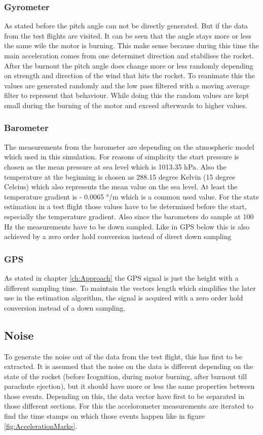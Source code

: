 \subsubsection{Gyrometer}
As stated before the pitch angle can not be directly generated.
But if the data from the test flights are visited. It can be seen that the angle stays more or less the same wile the motor is burning.
This make sense because during this time the main acceleration comes from one determinet direction and stabilises the rocket.
After the burnout the pitch angle does change more or less randomly depending on strength and direction of the wind that hits the rocket.
To reanimate this the values are generated randomly and the low pass filtered with a moving average filter to represent that behaviour.
While doing this the random values are kept small during the burning of the motor and exceed afterwards to higher values.

\subsubsection{Barometer}
The measurements from the barometer are depending on the atmospheric model which used in this simulation.
For reasons of simplicity the start pressure is chosen as the mean pressure at sea level which is 1013.35 hPa.
Also the temperature at the beginning is chosen as 288.15 degree Kelvin (15 degree Celcius) which also represents the mean value on the sea level.
At least the temperature gradient is - 0.0065 °/m which is a common used value.
For the state estimation in a test flight those values have to be determined before the start, especially the temperature gradient.
Also since the barometers do sample at 100 Hz the measurements have to be down sampled.
Like in GPS below this is also achieved by a zero order hold conversion instead of direct down sampling

\subsubsection{GPS}
As stated in chapter \ref{ch:Approach} the GPS signal is just the height with a different sampling time. 
To maintain the vectors length which simplifies the later use in the estimation algorithm,
the signal is acquired with a zero order hold conversion instead of a down sampling. 


\subsection{Noise}
To generate the noise out of the data from the test flight, this has first to be extracted.
It is assumed that the noise on the data is different depending on the state of the rocket (before Icognition, during motor burning, after burnout till parachute ejection),
but it should have more or less the same properties between those events.
Depending on this, the data vector have first to be separated in those different sections.
For this the accelorometer measurements are iterated to find the time stamps on which those events happen like in figure \ref{fig:AccelerationMarks}.


